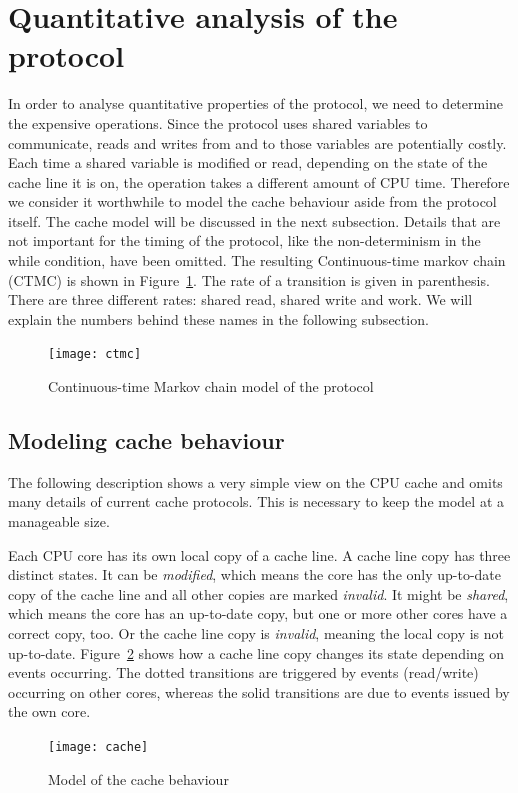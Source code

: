 \documentclass[a4paper, 10pt]{article}
\begin{document}
\section{Quantitative analysis of the protocol}
In order to analyse quantitative properties of the protocol, we need to determine the expensive operations. Since the protocol uses shared variables to communicate, reads and writes from and to those variables are potentially costly. Each time a shared variable is modified or read, depending on the state of the cache line it is on, the operation takes a different amount of CPU time. Therefore we consider it worthwhile to model the cache behaviour aside from the protocol itself. The cache model will be discussed in the next subsection. Details that are not important for the timing of the protocol, like the non-determinism in the while condition, have been omitted. The resulting Continuous-time markov chain (CTMC) is shown in Figure~\ref{fig:ctmc}. The rate of a transition is given in parenthesis. There are three different rates: shared read, shared write and work. We will explain the numbers behind these names in the following subsection.
\begin{figure}[htbp]
	\centering
	\texttt{[image: ctmc]}
	\caption{Continuous-time Markov chain model of the protocol}
	\label{fig:ctmc}
\end{figure}
\subsection{Modeling cache behaviour}
The following description shows a very simple view on the CPU cache and omits many details of current cache protocols. This is necessary to keep the model at a manageable size.

Each CPU core has its own local copy of a cache line. A cache line copy has three distinct states. It can be \emph{modified}, which means the core has the only up-to-date copy of the cache line and all other copies are marked \emph{invalid}. It might be \emph{shared}, which means the core has an up-to-date copy, but one or more other cores have a correct copy, too. Or the cache line copy is \emph{invalid}, meaning the local copy is not up-to-date. Figure~\ref{fig:cache} shows how a cache line copy changes its state depending on events occurring. The dotted transitions are triggered by events (read/write) occurring on other cores, whereas the solid transitions are due to events issued by the own core.
\begin{figure}[htbp]
	\centering
	\texttt{[image: cache]}
	\caption{Model of the cache behaviour}
	\label{fig:cache}
\end{figure}
\end{document}
